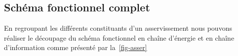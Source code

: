 \subsection{Schéma fonctionnel complet}

En regroupant les différents constituants d'un asservissement
nous pouvons réaliser le découpage du schéma fonctionnel en 
chaîne d'énergie et en chaîne d'information comme présenté par 
la~\cref{fig-asser}


